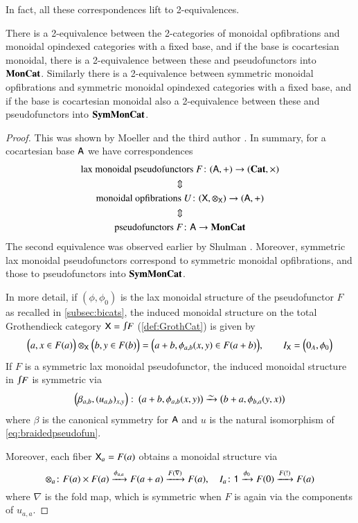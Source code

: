 \documentclass[reqno]{amsart}
\begin{document}
In fact, all these correspondences lift to 2-equivalences.

\begin{lem}\label{lem:MonGroth}
There is a 2-equivalence between the 2-categories of monoidal opfibrations and monoidal opindexed categories with a fixed base, and if the base is cocartesian monoidal, there is a 2-equivalence between these and pseudofunctors into $\mathbf{MonCat}$.   Similarly there is a 2-equivalence between symmetric monoidal opfibrations and symmetric monoidal opindexed categories with a fixed base, and if the base is cocartesian monoidal also a 2-equivalence between these and pseudofunctors into $\mathbf{SymMonCat}$.   
\end{lem}

\begin{proof}
This was shown by Moeller and the third author \cite[Theorems~3.13 \& 4.2]{MV}. In summary, for a cocartesian base $\mathsf{A}$ we have correspondences
\begin{gather}
\textrm{lax monoidal pseudofunctors }F\colon(\mathsf{A},+)\to(\mathbf{Cat},\times) \notag\\
\Updownarrow \notag\\
\textrm{monoidal opfibrations }U\colon(\mathsf{X},\otimes_{\mathsf{X}})\to(\mathsf{A},+) \notag\\
\Updownarrow \notag\\
\textrm{pseudofunctors } F \colon \mathsf{A}\to \mathbf{MonCat} \notag
\end{gather}
The second equivalence was observed earlier by Shulman \cite{Shulman2008}. Moreover, symmetric lax monoidal pseudofunctors correspond to symmetric monoidal opfibrations, and those to pseudofunctors into $\mathbf{SymMonCat}$.

In more detail, if $(\phi,\phi_0)$ is the lax monoidal structure of the pseudofunctor $F$ as recalled in \cref{subsec:bicats}, the induced monoidal structure on the total Grothendieck category $\X=\inta F$ (\cref{def:GrothCat}) is given by
\begin{equation}\label{eq:explicitstructure2}
\Big(a,x\in F(a)\Big)\otimes_{\mathsf{X}}\Big(b,y\in F(b)\Big)=\Big(a+b,\phi_{a,b}(x,y)\in F(a+b)\Big), \qquad I_{\mathsf{X}}=\Big(0_A,\phi_0\Big)
\end{equation}
If $F$ is a symmetric lax monoidal pseudofunctor, the induced monoidal structure in $\inta F$ is symmetric via
$$\left(\beta_{a,b},(u_{a,b})_{x,y}\right)\colon \left(a+b,\phi_{a,b}(x,y)\right)\simrightarrow\left(b+a,\phi_{b,a}(y,x)\right)$$ where $\beta$ is the canonical symmetry for $\mathsf{A}$ and $u$ is the natural isomorphism of \cref{eq:braidedpseudofun}.

Moreover, each fiber $\mathsf{X}_a=F(a)$ obtains a monoidal structure via 
\begin{equation}\label{eq:explicitstructure1}
\otimes_a\colon F(a)\times F(a)\xrightarrow{\phi_{a,a}}F(a+a)\xrightarrow{F(\nabla)}F(a),\quad
I_a\colon\mathsf{1}\xrightarrow{\phi_0}F(0)\xrightarrow{F(!)}F(a)
\end{equation}
where $\nabla$ is the fold map, which is symmetric when $F$ is again via the components of $u_{a,a}$.
\end{proof}
\end{document}
